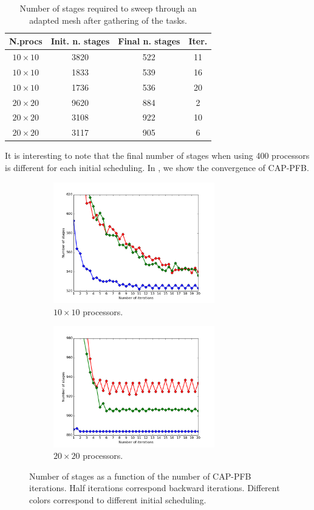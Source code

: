 \documentclass[letterpaper]{article}
\renewcommand{\(}{\left(}
\renewcommand{\)}{\right)}
\renewcommand{\[}{\left[}
\renewcommand{\]}{\right]}
\begin{document}
\begin{table}[H]
  \begin{center}
    \begin{tabular}{|c|c|c|c|}
      \hline
      N.procs & Init. n. stages & Final n. stages & Iter. \\
      \hline
      $10 \times 10$ & 3820 & 522 & 11 \\
      $10 \times 10$ & 1833 & 539 & 16 \\
      $10 \times 10$ & 1736 & 536 & 20 \\
      $20 \times 20$ & 9620 & 884 & 2  \\
      $20 \times 20$ & 3108 & 922 & 10 \\
      $20 \times 20$ & 3117 & 905 & 6  \\
      \hline
    \end{tabular}
    \caption{Number of stages required to sweep through an adapted mesh after
    gathering of the tasks.}
    \label{band_2}
  \end{center}
\end{table}

It is interesting to note that the final number of stages when using 400
processors is different for each initial scheduling. In ,
we show the convergence of CAP-PFB. 

\begin{figure}[H]
  \begin{subfigure}[b]{.5\textwidth}
    \centering
    \includegraphics[width=7cm]{convergence_band_20_20}
    \caption{$10\times 10$ processors.}
  \end{subfigure}
  \begin{subfigure}[b]{.5\textwidth}
    \centering
    \includegraphics[width=7cm]{convergence_band_40_40}
    \caption{$20\times 20$ processors.}
  \end{subfigure}
  \caption{Number of stages as a function of the number of CAP-PFB iterations.
  Half iterations correspond backward iterations. Different colors correspond to
  different initial scheduling.}
  \label{convergence_band}
\end{figure}
 
\end{document}

